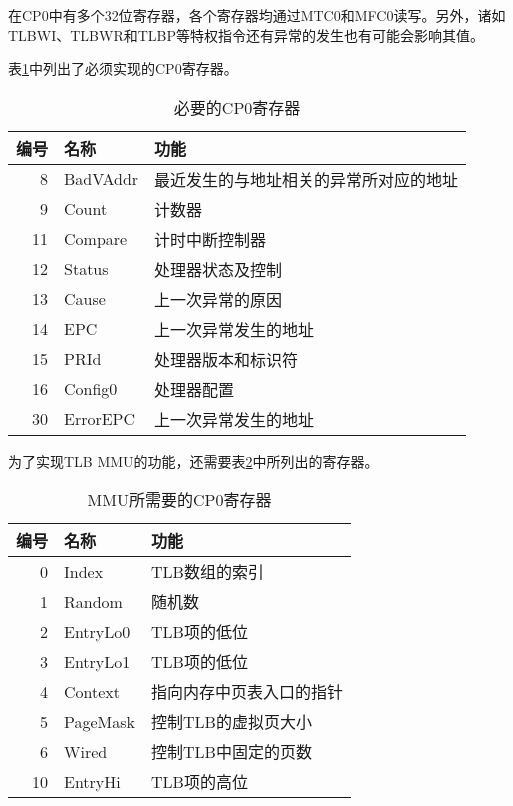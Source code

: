 在CP0中有多个32位寄存器，各个寄存器均通过MTC0和MFC0读写。另外，诸如TLBWI、TLBWR和TLBP等特权指令还有异常的发生也有可能会影响其值。

表\ref{table:required_cp0_registers}中列出了必须实现的CP0寄存器。

\begin{table}[!htbp]
    \centering
    \caption{必要的CP0寄存器}
    \label{table:required_cp0_registers}
    \begin{tabular}{|r|l|l|}
    \hline
    \textbf{编号} & \textbf{名称} & \textbf{功能}  \\ \hline
	8 & BadVAddr & 最近发生的与地址相关的异常所对应的地址 \\ \hline
	9 & Count & 计数器 \\ \hline
	11 & Compare & 计时中断控制器 \\ \hline
	12 & Status & 处理器状态及控制 \\ \hline
	13 & Cause & 上一次异常的原因 \\ \hline
	14 & EPC & 上一次异常发生的地址 \\ \hline
	15 & PRId & 处理器版本和标识符 \\ \hline
	16 & Config0 & 处理器配置 \\ \hline
	30 & ErrorEPC & 上一次异常发生的地址 \\ \hline
    \end{tabular}
\end{table}

为了实现TLB MMU的功能，还需要表\ref{table:mmu_cp0_registers}中所列出的寄存器。

\begin{table}[!htbp]
    \centering
    \caption{MMU所需要的CP0寄存器}
    \label{table:mmu_cp0_registers}
    \begin{tabular}{|r|l|l|}
    \hline
    \textbf{编号} & \textbf{名称} & \textbf{功能}  \\ \hline
	0 & Index & TLB数组的索引 \\ \hline
	1 & Random & 随机数 \\ \hline
	2 & EntryLo0 & TLB项的低位 \\ \hline
	3 & EntryLo1 & TLB项的低位 \\ \hline
	4 & Context & 指向内存中页表入口的指针 \\ \hline
	5 & PageMask & 控制TLB的虚拟页大小 \\ \hline
	6 & Wired & 控制TLB中固定的页数 \\ \hline
	10 & EntryHi & TLB项的高位 \\ \hline
    \end{tabular}
\end{table}

